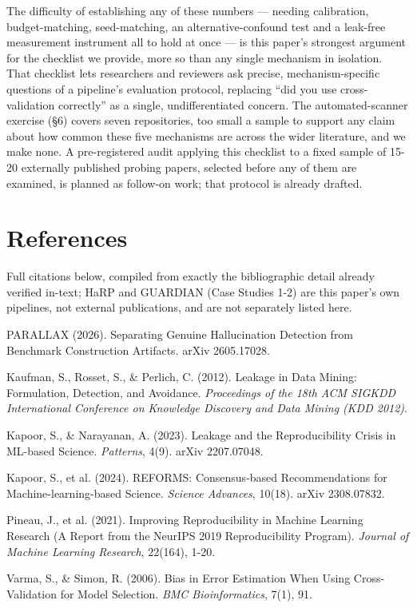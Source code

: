 \documentclass[10pt]{article} %
\begin{document}
The difficulty of establishing any of these numbers --- needing calibration,
budget-matching, seed-matching, an alternative-confound test and a leak-free
measurement instrument all to hold at once --- is this paper's strongest
argument for the checklist we provide, more so than any single mechanism in
isolation. That checklist lets researchers and reviewers ask precise,
mechanism-specific questions of a pipeline's evaluation protocol, replacing
``did you use cross-validation correctly'' as a single, undifferentiated
concern. The automated-scanner exercise (§6) covers seven repositories, too
small a sample to support any claim about how common these five mechanisms are
across the wider literature, and we make none. A pre-registered audit applying
this checklist to a fixed sample of 15-20 externally published probing papers,
selected before any of them are examined, is planned as follow-on work; that
protocol is already drafted.

\section{References}

Full citations below, compiled from exactly the bibliographic detail
already verified in-text; HaRP and GUARDIAN (Case Studies 1-2) are this
paper's own pipelines, not external publications, and are not separately
listed here.

PARALLAX (2026). Separating Genuine Hallucination Detection from
Benchmark Construction Artifacts. arXiv 2605.17028.

Kaufman, S., Rosset, S., \& Perlich, C. (2012). Leakage in Data Mining:
Formulation, Detection, and Avoidance. \emph{Proceedings of the 18th ACM
SIGKDD International Conference on Knowledge Discovery and Data Mining
(KDD 2012)}.

Kapoor, S., \& Narayanan, A. (2023). Leakage and the Reproducibility
Crisis in ML-based Science. \emph{Patterns}, 4(9). arXiv 2207.07048.

Kapoor, S., et al. (2024). REFORMS: Consensus-based Recommendations for
Machine-learning-based Science. \emph{Science Advances}, 10(18). arXiv 2308.07832.

Pineau, J., et al. (2021). Improving Reproducibility in Machine Learning
Research (A Report from the NeurIPS 2019 Reproducibility Program).
\emph{Journal of Machine Learning Research}, 22(164), 1-20.

Varma, S., \& Simon, R. (2006). Bias in Error Estimation When Using
Cross-Validation for Model Selection. \emph{BMC Bioinformatics}, 7(1), 91.
\end{document}
